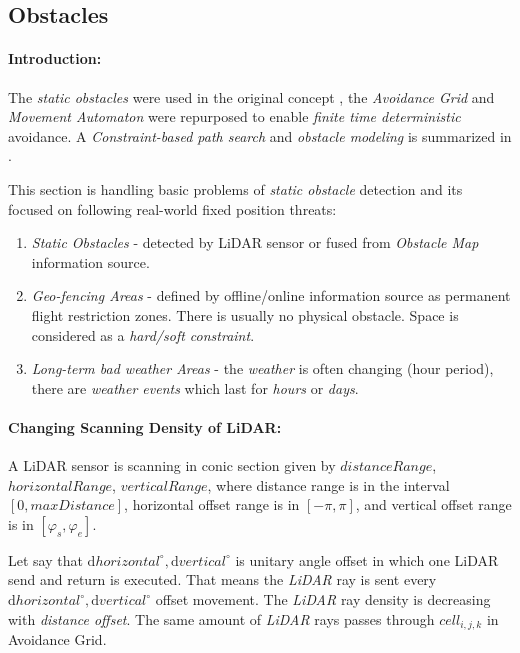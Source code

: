 \subsection{Obstacles}\label{s:staticObstacles}
    
\paragraph{Introduction:} The \emph{static obstacles} were used in the original concept \cite{gomola2017probabilistic}, the \emph{Avoidance Grid} and \emph{Movement Automaton} were repurposed to enable \emph{finite time deterministic} avoidance. A \emph{Constraint-based path search} and \emph{obstacle modeling} is summarized in \cite{hentenryck2009constraint}.

This section is handling basic problems of \emph{static obstacle} detection and its focused on following real-world fixed position threats:
\begin{enumerate}
    \item \emph{Static Obstacles} - detected by LiDAR sensor or fused from \emph{Obstacle Map} information source.
    
    \item \emph{Geo-fencing Areas} - defined by offline/online information source as permanent flight restriction zones. There is usually no physical obstacle. Space is considered as a \emph{hard/soft constraint}.
    
    \item \emph{Long-term bad weather Areas} - the \emph{weather} is often changing (hour period), there are \emph{weather events}  which last for \emph{hours} or \emph{days}.
\end{enumerate}


\paragraph{Changing Scanning Density of LiDAR:} A LiDAR sensor is scanning in conic section given by $distance Range$, $horizontal Range$, $vertical Range$, where distance range is in the interval $[0,maxDistance]$, horizontal offset range is in $[-\pi,\pi]$, and vertical offset range is in $[\varphi_s, \varphi_e]$.  

Let say that $\text{d} horizontal^\circ, \text{d} vertical^\circ$ is unitary angle offset in which one LiDAR send and return is executed. That means the \emph{LiDAR} ray is sent every $\text{d} horizontal^\circ, \text{d} vertical^\circ$ offset movement. The \emph{LiDAR} ray density is decreasing with \emph{distance offset}. The same amount of \emph{LiDAR} rays passes through $cell_{i,j,k}$ in Avoidance Grid.

